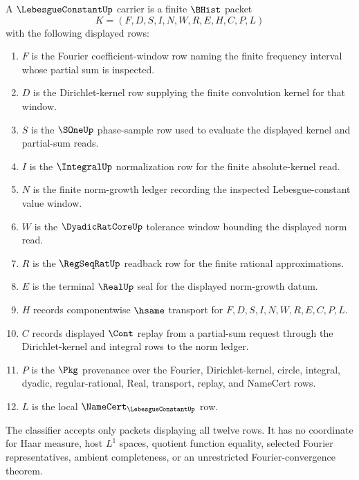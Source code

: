 \begin{definition}
\label{def:lebesgue-constant-carrier}
A $\LebesgueConstantUp$ carrier is a finite $\BHist$ packet
$$
K=(F,D,S,I,N,W,R,E,H,C,P,L)
$$
with the following displayed rows:
\begin{enumerate}
\item $F$ is the Fourier coefficient-window row naming the finite frequency interval whose partial sum is inspected.
\item $D$ is the Dirichlet-kernel row supplying the finite convolution kernel for that window.
\item $S$ is the $\SOneUp$ phase-sample row used to evaluate the displayed kernel and partial-sum reads.
\item $I$ is the $\IntegralUp$ normalization row for the finite absolute-kernel read.
\item $N$ is the finite norm-growth ledger recording the inspected Lebesgue-constant value window.
\item $W$ is the $\DyadicRatCoreUp$ tolerance window bounding the displayed norm read.
\item $R$ is the $\RegSeqRatUp$ readback row for the finite rational approximations.
\item $E$ is the terminal $\RealUp$ seal for the displayed norm-growth datum.
\item $H$ records componentwise $\hsame$ transport for $F,D,S,I,N,W,R,E,C,P,L$.
\item $C$ records displayed $\Cont$ replay from a partial-sum request through the Dirichlet-kernel and integral rows to the norm ledger.
\item $P$ is the $\Pkg$ provenance over the Fourier, Dirichlet-kernel, circle, integral, dyadic, regular-rational, Real, transport, replay, and NameCert rows.
\item $L$ is the local $\NameCert_{\LebesgueConstantUp}$ row.
\end{enumerate}
The classifier accepts only packets displaying all twelve rows. It has no coordinate for Haar measure, host $L^{1}$ spaces, quotient function equality, selected Fourier representatives, ambient completeness, or an unrestricted Fourier-convergence theorem.
\end{definition}

